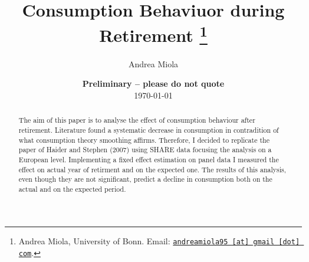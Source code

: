 \usepackage[T1]{fontenc}
\usepackage[utf8]{inputenc}
\usepackage{float, afterpage, rotating, graphicx}
\usepackage{epstopdf}
\usepackage{longtable, booktabs, tabularx}
\usepackage{fancyvrb, moreverb, relsize}
\usepackage{eurosym, calc}
\usepackage{amsmath, amssymb, amsfonts, amsthm, bm}
\usepackage{caption}
\usepackage{mdwlist}
\usepackage{xfrac}
\usepackage{setspace}
\usepackage{xcolor}
\usepackage{subcaption}
\usepackage{minibox}



\usepackage[
    natbib=true,
    bibencoding=inputenc,
    bibstyle=authoryear-ibid,
    citestyle=authoryear-comp,
    maxcitenames=3,
    maxbibnames=10,
    useprefix=false,
    sortcites=true,
    backend=biber
]{biblatex}
\setlength{\bibitemsep}{1.5ex}






\usepackage[unicode=true]{hyperref}
\hypersetup{
    colorlinks=true,
    linkcolor=black,
    anchorcolor=black,
    citecolor=black,
    filecolor=black,
    menucolor=black,
    runcolor=black,
    urlcolor=black
}



\setlength{\parskip}{1ex}
\setlength{\parindent}{0ex}




\title{Consumption Behaviuor during Retirement \thanks{Andrea Miola, University of Bonn. Email: \href{mailto:andreamiola95@gmail.com}{\nolinkurl{andreamiola95 [at] gmail [dot] com}}.}}

\author{Andrea Miola}

\date{
{\bf Preliminary -- please do not quote}
\\[1ex]
\today
}

\maketitle


\begin{abstract}
The aim of this paper is to analyse the effect of consumption behaviour after retirement. Literature found a systematic decrease in consumption in contradition of what consumption theory smoothing affirms. Therefore, I decided to replicate the paper of Haider and Stephen (2007) using SHARE data focusing the analysis on a European level. Implementing a fixed effect estimation on panel data I measured the effect on actual year of retirment and on the expected one. The results of this analysis, even though they are not significant, predict a decline in consumption both on the actual and on the expected period.

\end{abstract}
\clearpage

